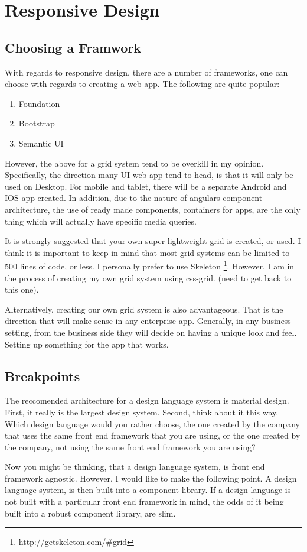 \section{ Responsive Design }

\subsection{ Choosing a Framwork }
With regards to responsive design, there are a number of frameworks, one can
choose with regards to creating a web app. The following are quite popular:
\begin{enumerate}
  \item Foundation
  \item Bootstrap
  \item Semantic UI
\end{enumerate}

However, the above for a grid system tend to be overkill in my opinion.
Specifically, the direction many UI web app tend to head, is that it will only
be used on Desktop. For mobile and tablet, there will be a separate Android and
IOS app created. In addition, due to the nature of angulars component
architecture, the use of ready made components, containers for apps, are the
only thing which will actually have specific media queries.

It is strongly suggested that your own super lightweight grid is created, or
used. I think it is important to keep in mind that most grid systems can be
limited to 500 lines of code, or less. I personally prefer to use Skeleton
\footnote{http://getskeleton.com/\#grid}. However, I am in the process of
creating my own grid system using css-grid. (need to get back to this one).

Alternatively, creating our own grid system is also advantageous. That is the
direction that will make sense in any enterprise app. Generally, in any business
setting, from the business side they will decide on having a unique look and
feel. Setting up something for the app that works.

\subsection{ Breakpoints }
The reccomended architecture for a design language system is material design.
First, it really is the largest design system. Second, think about it this way.
Which design language would you rather choose, the one created by the company
that uses the same front end framework that you are using, or the one created
by the company, not using the same front end framework you are using?

Now you might be thinking, that a design language system, is front end framework
agnostic. However, I would like to make the following point. A design language
system, is then built into a component library. If a design language is not
built with a particular front end framework in mind, the odds of it being
built into a robust component library, are slim.
